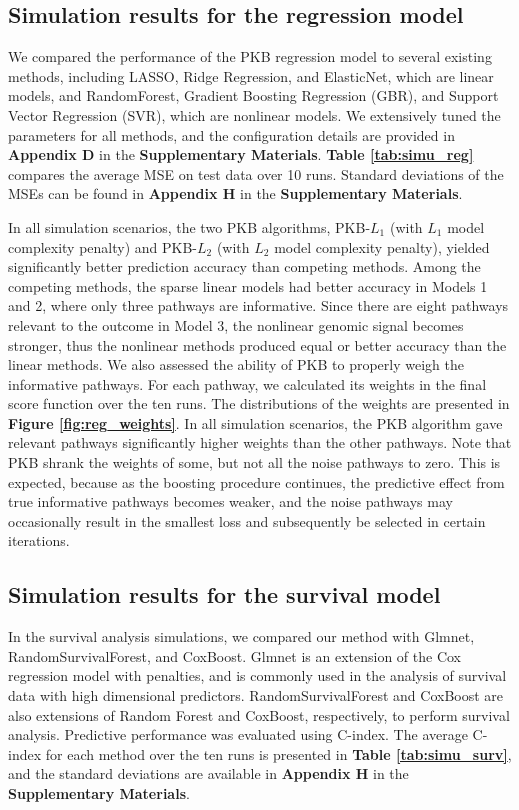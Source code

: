 \documentclass[a4paper,12pt]{article}
\begin{document}
\subsection{Simulation results for the regression model}
We compared the performance of the PKB regression model to several existing methods, including LASSO,\cite{tibshirani1996regression} Ridge Regression,\cite{hoerl1970ridge} and ElasticNet, \citep{zou2005regularization} which are linear models, and RandomForest,\citep{breiman2001random} Gradient Boosting Regression (GBR), \citep{friedman2001greedy} and Support Vector Regression (SVR),\citep{smola2004tutorial} which are nonlinear models. We extensively tuned the parameters for all methods, and the configuration details are provided in \textbf{Appendix D} in the \textbf{Supplementary Materials}. \textbf{Table \ref{tab:simu_reg}} compares the average MSE on test data over 10 runs. Standard deviations of the MSEs can be found in \textbf{Appendix H} in the \textbf{Supplementary Materials}.

In all simulation scenarios, the two PKB algorithms, PKB-$L_1$ (with $L_1$ model complexity penalty) and PKB-$L_2$ (with $L_2$ model complexity penalty), yielded significantly better prediction accuracy than competing methods. Among the competing methods, the sparse linear models had better accuracy in Models 1 and 2, where only three pathways are informative. Since there are eight pathways relevant to the outcome in Model 3, the nonlinear genomic signal becomes stronger, thus the nonlinear methods produced equal or better accuracy than the linear methods. We also assessed the ability of PKB to properly weigh the informative pathways. For each pathway, we calculated its weights in the final score function over the ten runs. The distributions of the weights are presented in \textbf{Figure \ref{fig:reg_weights}}. In all simulation scenarios, the PKB algorithm gave relevant pathways significantly higher weights than the other pathways. Note that PKB shrank the weights of some, but not all the noise pathways to zero. This is expected, because as the boosting procedure continues, the predictive effect from true informative pathways becomes weaker, and the noise pathways may occasionally result in the smallest loss and subsequently be selected in certain iterations.

\subsection{Simulation results for the survival model}
In the survival analysis simulations, we compared our method with Glmnet,\citep{simon2011regularization} RandomSurvivalForest, \citep{ishwaran2008random} and CoxBoost. \citep{binder2013coxboost} Glmnet is an extension of the Cox regression model with penalties, and is commonly used in the analysis of survival data with high dimensional predictors. RandomSurvivalForest and CoxBoost are also extensions of Random Forest and CoxBoost, respectively,  to perform survival analysis. Predictive performance was evaluated using C-index. The average C-index for each method over the ten runs is presented in \textbf{Table \ref{tab:simu_surv}}, and the standard deviations are available in \textbf{Appendix H} in the \textbf{Supplementary Materials}. 
\end{document}
